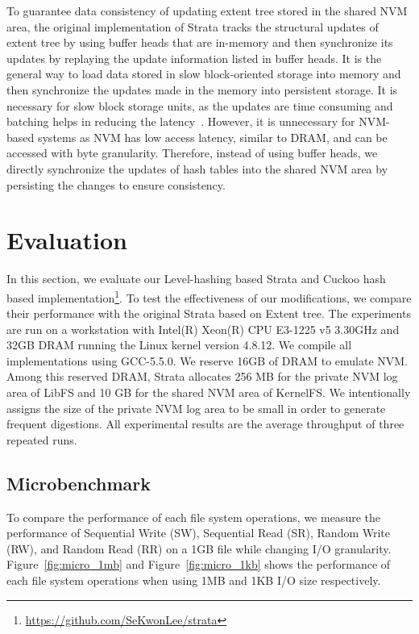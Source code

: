 \documentclass[letterpaper,twocolumn, 11pt]{article}
\begin{document}
To guarantee data consistency of updating extent tree stored in the shared NVM area, the original implementation of Strata tracks the structural updates of extent tree by using buffer heads that are in-memory and then synchronize its updates by replaying the update information listed in buffer heads. It is the general way to load data stored in slow block-oriented storage into memory and then synchronize the updates made in the memory into persistent storage. It is necessary for slow block storage units, as the updates are time consuming and batching helps in reducing the latency~\cite{tweedie1998journaling,axboe2004linux}. However, it is unnecessary for NVM-based systems as NVM has low access latency, similar to DRAM, and can be accessed with byte granularity. Therefore, instead of using buffer heads, we directly synchronize the updates of hash tables into the shared NVM area by persisting the changes to ensure consistency. 
\vspace{-0.3cm}
\section{Evaluation} \label{evaluation}
\vspace{-0.2cm}
In this section, we evaluate our Level-hashing based Strata and Cuckoo hash based implementation\footnote{\url{https://github.com/SeKwonLee/strata}}. To test the effectiveness of our modifications, we compare their performance with the original Strata based on Extent tree. The experiments are run on a workstation with Intel(R) Xeon(R) CPU E3-1225 v5 3.30GHz and 32GB DRAM running the Linux kernel version 4.8.12. We compile all implementations using GCC-5.5.0. We reserve 16GB of DRAM to emulate NVM. Among this reserved DRAM, Strata allocates 256 MB for the private NVM log area of LibFS and 10 GB for the shared NVM area of KernelFS. We intentionally assigns the size of the private NVM log area to be small in order to generate frequent digestions. All experimental results are the average throughput of three repeated runs.

\subsection{Microbenchmark}
To compare the performance of each file system operations, we measure the performance of Sequential Write (SW), Sequential Read (SR), Random Write (RW), and Random Read (RR) on a 1GB file while changing I/O granularity. Figure~\ref{fig:micro_1mb} and Figure~\ref{fig:micro_1kb} shows the performance of each file system operations when using 1MB and 1KB I/O size respectively.
\end{document}
